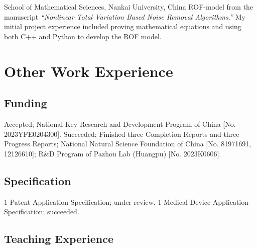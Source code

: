 \documentclass[11pt,a4paper, final]{moderncv}
\newcommand{\spacesection}{\vspace{0.4cm}}
\newcommand{\spacesubsection}{\vspace{0.2cm}}
\begin{document}
	{}{}{School of Mathematical Sciences, Nankai University, China}
	{ROF-model from the manuscript \emph{``Nonlinear Total Variation Based Noise Removal Algorithms.''}}
	{My initial project experience included proving mathematical equations and using both C++ and Python to develop the ROF model.}
\section{\textbf{Other Work Experience}}
	\subsection{\textbf{Funding}}
		{Accepted; National Key Research and Development Program of China [No. 2023YFE0204300].}
		{Succeeded; Finished three Completion Reports and three Progress Reports; 
		National Natural Science Foundation of China [No. 81971691, 12126610]; 
		R\&D Program of Pazhou Lab (Huangpu) [No. 2023K0606].}
	\subsection{\textbf{Specification}}
		{1 Patent Application Specification; under review.}
		{1 Medical Device Application Specification; succeeded.}
	\subsection{\textbf{Teaching Experience}}
\end{document}
